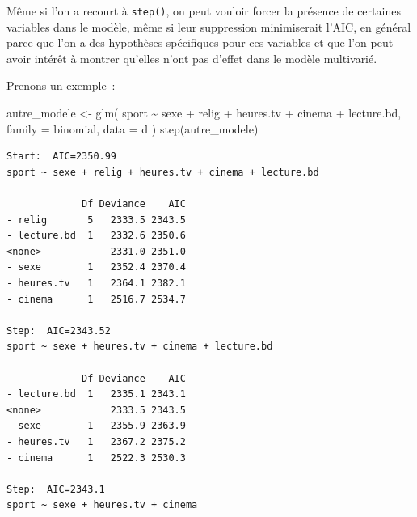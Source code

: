 \documentclass[
  letterpaper,
  DIV=11,
  numbers=noendperiod,
  oneside]{scrreprt}
\newenvironment{Shaded}{\begin{snugshade}}{\end{snugshade}}
\newcommand{\AttributeTok}[1]{\textcolor[rgb]{0.40,0.45,0.13}{#1}}
\newcommand{\FunctionTok}[1]{\textcolor[rgb]{0.28,0.35,0.67}{#1}}
\newcommand{\NormalTok}[1]{\textcolor[rgb]{0.00,0.23,0.31}{#1}}
\newcommand{\OtherTok}[1]{\textcolor[rgb]{0.00,0.23,0.31}{#1}}
\newcommand{\SpecialCharTok}[1]{\textcolor[rgb]{0.37,0.37,0.37}{#1}}
\begin{document}
\begin{tcolorbox}[enhanced jigsaw, colbacktitle=quarto-callout-tip-color!10!white, opacityback=0, toprule=.15mm, colback=white, coltitle=black, bottomtitle=1mm, toptitle=1mm, titlerule=0mm, rightrule=.15mm, title=\textcolor{quarto-callout-tip-color}{\faLightbulb}\hspace{0.5em}{Forcer certaines variables dans le modèle réduit}, breakable, bottomrule=.15mm, opacitybacktitle=0.6, arc=.35mm, left=2mm, leftrule=.75mm, colframe=quarto-callout-tip-color-frame]

Même si l'on a recourt à \texttt{step()}, on peut vouloir forcer la
présence de certaines variables dans le modèle, même si leur suppression
minimiserait l'AIC, en général parce que l'on a des hypothèses
spécifiques pour ces variables et que l'on peut avoir intérêt à montrer
qu'elles n'ont pas d'effet dans le modèle multivarié.

Prenons un exemple~:

\begin{Shaded}
\begin{Highlighting}[]
\NormalTok{autre\_modele }\OtherTok{\textless{}{-}} \FunctionTok{glm}\NormalTok{(}
\NormalTok{  sport }\SpecialCharTok{\textasciitilde{}}\NormalTok{ sexe }\SpecialCharTok{+}\NormalTok{ relig }\SpecialCharTok{+}\NormalTok{ heures.tv }\SpecialCharTok{+}\NormalTok{ cinema }\SpecialCharTok{+}\NormalTok{ lecture.bd,}
  \AttributeTok{family =}\NormalTok{ binomial,}
  \AttributeTok{data =}\NormalTok{ d}
\NormalTok{)}
\FunctionTok{step}\NormalTok{(autre\_modele)}
\end{Highlighting}
\end{Shaded}

\begin{verbatim}
Start:  AIC=2350.99
sport ~ sexe + relig + heures.tv + cinema + lecture.bd

             Df Deviance    AIC
- relig       5   2333.5 2343.5
- lecture.bd  1   2332.6 2350.6
<none>            2331.0 2351.0
- sexe        1   2352.4 2370.4
- heures.tv   1   2364.1 2382.1
- cinema      1   2516.7 2534.7

Step:  AIC=2343.52
sport ~ sexe + heures.tv + cinema + lecture.bd

             Df Deviance    AIC
- lecture.bd  1   2335.1 2343.1
<none>            2333.5 2343.5
- sexe        1   2355.9 2363.9
- heures.tv   1   2367.2 2375.2
- cinema      1   2522.3 2530.3

Step:  AIC=2343.1
sport ~ sexe + heures.tv + cinema


\end{verbatim}
\end{tcolorbox}
\end{document}
